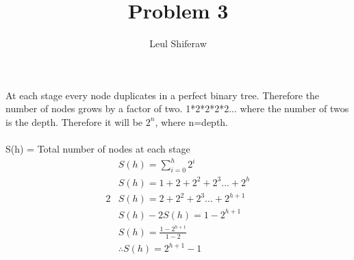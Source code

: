 \documentclass{article}
\title{Problem 3}
\author{Leul Shiferaw}
\begin{document}
	\maketitle
	\newpage
	At each stage every node duplicates in a perfect binary tree. Therefore the number of nodes grows by a factor of two. 1*2*2*2*2... where the number of twos is the depth. Therefore it will be $2^n$, where n=depth.\\\\
	\indent \indent \indent \indent \indent \indent S(h) = Total number of nodes at each stage
	\begin{align*}
		&S(h) = \sum_{i=0}^{h} 2^i\\
		&S(h) = 1+2+2^2+2^3...+2^{h}\\
		2&S(h) = 2+2^{2}+2^{3}...+2^{h+1}\\
		&S(h)-2S(h) = 1-2^{h+1}\\
		&S(h)=\frac{1-2^{h+1}}{1-2}\\
		&\therefore	S(h)=2^{h+1}-1
	\end{align*}
\end{document}
